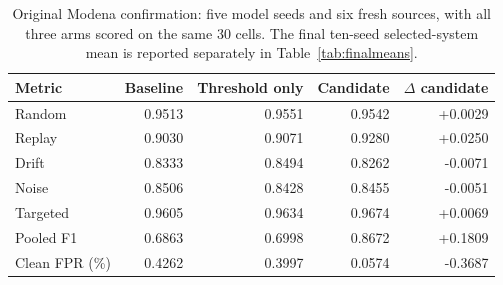 \begin{table}[tbp]
\centering\small
\caption[Original matched Modena confirmation]{Original Modena confirmation: five model seeds and six fresh sources, with all three arms scored on the same 30 cells. The final ten-seed selected-system mean is reported separately in Table~\ref{tab:finalmeans}.}
\label{tab:modenapaired}
\begin{tabular}{@{}lrrrr@{}}
\toprule
Metric & Baseline & Threshold only & Candidate & $\Delta$ candidate\\
\midrule
Random & 0.9513 & 0.9551 & 0.9542 & +0.0029\\
Replay & 0.9030 & 0.9071 & 0.9280 & +0.0250\\
Drift & 0.8333 & 0.8494 & 0.8262 & -0.0071\\
Noise & 0.8506 & 0.8428 & 0.8455 & -0.0051\\
Targeted & 0.9605 & 0.9634 & 0.9674 & +0.0069\\
Pooled F1 & 0.6863 & 0.6998 & 0.8672 & +0.1809\\
Clean FPR (\%) & 0.4262 & 0.3997 & 0.0574 & -0.3687\\
\bottomrule
\end{tabular}
\end{table}
